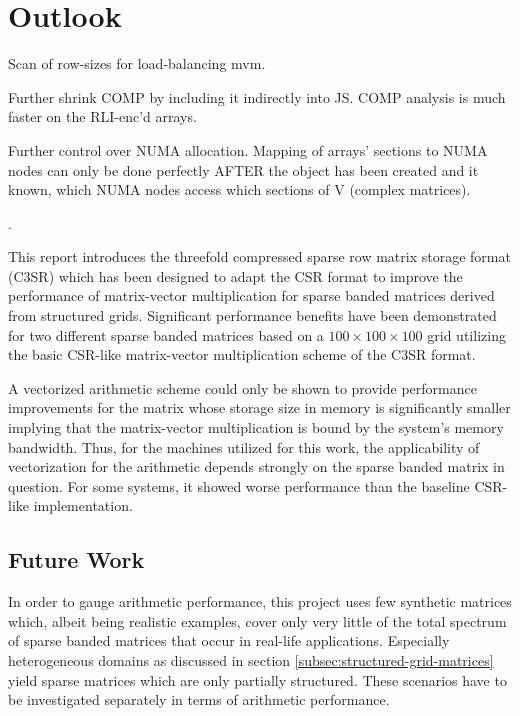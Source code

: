 \chapter{Outlook}

Scan of row-sizes for load-balancing mvm.

Further shrink COMP by including it indirectly into JS. COMP analysis is much faster on the RLI-enc'd arrays.

Further control over NUMA allocation. Mapping of arrays' sections to NUMA nodes can only be done perfectly AFTER the
object has been created and it known, which NUMA nodes access which sections of V (complex matrices).



.


  This report introduces the threefold compressed sparse row matrix storage format (C3SR) which has been designed to
  adapt the CSR format to improve the performance of matrix-vector multiplication for sparse banded matrices derived
  from structured grids. Significant performance benefits have been demonstrated for two different sparse banded
  matrices based on a $100 \times 100 \times 100$ grid utilizing the basic CSR-like matrix-vector multiplication scheme
  of the C3SR format.

  A vectorized arithmetic scheme could only be shown to provide performance improvements for the matrix whose storage
  size in memory is significantly smaller implying that the matrix-vector multiplication is bound by the system's memory
  bandwidth. Thus, for the machines utilized for this work, the applicability of vectorization for the arithmetic
  depends strongly on the sparse banded matrix in question. For some systems, it showed worse performance than the
  baseline CSR-like implementation.

  \section*{Future Work}

    In order to gauge arithmetic performance, this project uses few synthetic matrices which, albeit being realistic
    examples, cover only very little of the total spectrum of sparse banded matrices that occur in real-life
    applications. Especially heterogeneous domains as discussed in section \ref{subsec:structured-grid-matrices} yield
    sparse matrices which are only partially structured. These scenarios have to be investigated separately in terms of
    arithmetic performance.
